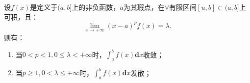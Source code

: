 \begin{corollary}[极限形式下的瑕积分比较原则]
	设$f(x)$是定义于$(a,b]$上的非负函数，$a$为其瑕点，在$\forall$有限区间$[u,b]\subset(a,b]$上可积，且：
	\begin{equation}
		\displaystyle\lim_{x\to +\infty}(x-a)^pf(x)=\lambda.
	\end{equation}
	则有：
	\begin{enumerate}
		\item 当$0<p<1,0\leq\lambda <+\infty$时，$\int_{a}^{b}f(x)\textbf{d}x$收敛；
		\item 当$p\geq 1,0<\lambda\leq +\infty$时，$\int_{a}^{b}f(x)\textbf{d}x$发散；
	\end{enumerate}
\end{corollary}







